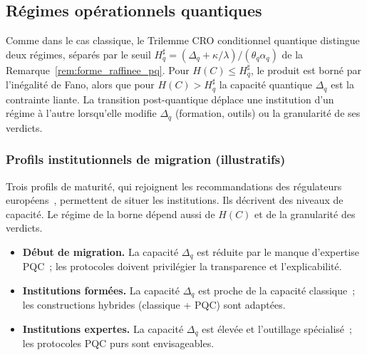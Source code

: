 \subsection{R\'egimes op\'erationnels quantiques}
\label{subsec:regimes_quantiques}
\begin{sloppypar}
Comme dans le cas classique, le Trilemme CRO conditionnel quantique
distingue deux r\'egimes, s\'epar\'es par le seuil
$H^\sharp_q = (\Delta_q + \kappa/\lambda)/(\theta_q\alpha_q)$ de la
Remarque~\ref{rem:forme_raffinee_pq}. Pour $H(C) \leq H^\sharp_q$, le produit
est born\'e par l'in\'egalit\'e de Fano, alors que pour $H(C) > H^\sharp_q$ la capacit\'e
quantique $\Delta_q$ est la contrainte liante. La transition post-quantique
d\'eplace une institution d'un r\'egime \`a l'autre lorsqu'elle modifie
$\Delta_q$ (formation, outils) ou la granularit\'e de ses verdicts.

\subsubsection{Profils institutionnels de migration (illustratifs)}
\label{subsubsec:regime_quantique_limite}
\label{subsubsec:regime_quantique_pret}
\label{subsubsec:regime_quantique_ameliore}

Trois profils de maturit\'e, qui rejoignent les recommandations des
r\'egulateurs europ\'eens~\cite{ENISA2021,ANSSI2022}, permettent de situer
les institutions. Ils d\'ecrivent des niveaux de capacit\'e. Le r\'egime de la borne d\'epend aussi de $H(C)$ et de la
granularit\'e des verdicts.

\begin{itemize}
\item \textbf{D\'ebut de migration.} La capacit\'e $\Delta_q$ est r\'eduite par le manque d'expertise
  PQC~; les protocoles doivent privil\'egier la transparence et
  l'explicabilit\'e.
\item \textbf{Institutions form\'ees.} La capacit\'e $\Delta_q$ est proche de la capacit\'e
  classique~; les constructions hybrides (classique + PQC) sont adapt\'ees.
\item \textbf{Institutions expertes.} La capacit\'e $\Delta_q$ est \'elev\'ee et l'outillage
  sp\'ecialis\'e~; les protocoles PQC purs sont envisageables.
\end{itemize}


\end{sloppypar}
